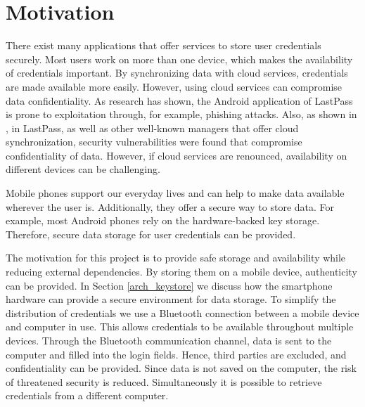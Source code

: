 \section{Motivation} \label{motivation}
There exist many applications that offer services to store user credentials securely. Most users work on more than one device, which makes the availability of credentials important.
By synchronizing data with cloud services, credentials are made available more easily. However, using cloud services can compromise data confidentiality. As research \cite{AndroidPhishing} has shown, the Android application of LastPass is prone to exploitation through, for example, phishing attacks. Also, as shown in \cite{PMLeak}, in LastPass, as well as other well-known managers that offer cloud synchronization, security vulnerabilities were found that compromise confidentiality of data. However, if cloud services are renounced, availability on different devices can be challenging.

Mobile phones support our everyday lives and can help to make data available wherever the user is. Additionally, they offer a secure way to store data. For example, most Android phones rely on the hardware-backed key storage. Therefore, secure data storage for user credentials can be provided. 

The motivation for this project is to provide safe storage and availability while reducing external dependencies. By storing them on a mobile device, authenticity can be provided. In Section \ref{arch_keystore} we discuss how the smartphone hardware can provide a secure environment for data storage. To simplify the distribution of credentials we use a Bluetooth connection between a mobile device and computer in use. This allows credentials to be available throughout multiple devices. Through the Bluetooth communication channel, data is sent to the computer and filled into the login fields. Hence, third parties are excluded, and confidentiality can be provided. Since data is not saved on the computer, the risk of threatened security is reduced. Simultaneously it is possible to retrieve credentials from a different computer. 

